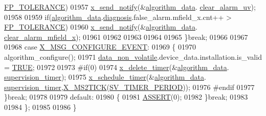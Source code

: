 \begin{DoxyCode}
      \hyperlink{a00017_a946f0acff4fd16a65859479e9e0b9513}{FP\_TOLERANCE})
01957               \hyperlink{a00036_ae17b0bb16da3c471bb6074bb4c4d0fee}{x\_send\_notify}(&\hyperlink{a00038_a183caa40cd01e79ee309cc9c4a225197}{algorithm\_data}.
      \hyperlink{a00016_a5d8e57dd19de326e75625a8704cfceee}{clear\_alarm\_uv});
01958 
01959               \textcolor{keywordflow}{if}(\hyperlink{a00038_a183caa40cd01e79ee309cc9c4a225197}{algorithm\_data}.\hyperlink{a00016_a16f85d57ec98b4ad05f5a2e10536b3c6}{diagnosis}.false\_alarm.mfield\_x.cnt++ > 
      \hyperlink{a00017_a946f0acff4fd16a65859479e9e0b9513}{FP\_TOLERANCE})
01960               \hyperlink{a00036_ae17b0bb16da3c471bb6074bb4c4d0fee}{x\_send\_notify}(&\hyperlink{a00038_a183caa40cd01e79ee309cc9c4a225197}{algorithm\_data}.
      \hyperlink{a00016_a57101a48bdde96a0db1ec63892095f7c}{clear\_alarm\_mfield\_x});
01961 
01962 
01963 
01964 
01965         \}\textcolor{keywordflow}{break};
01966 
01967 
01968         \textcolor{keywordflow}{case} \hyperlink{a00016_a410c7d83b819fa283303a53830c87a96}{X\_MSG\_CONFIGURE\_EVENT}:
01969         \{
01970             algorithm\_configure();
01971             \hyperlink{a00060_a76ac5f917f5308dcd83de0d7c94559fb}{data\_non\_volatile}.device\_data.installation.is\_valid = 
      \hyperlink{a00040_aa8cecfc5c5c054d2875c03e77b7be15d}{TRUE};
01972 
01973 \textcolor{preprocessor}{#if(0)}
01974           \hyperlink{a00036_ab69e9af4cfa717e870d587906283635c}{x\_delete\_timer}(&\hyperlink{a00038_a183caa40cd01e79ee309cc9c4a225197}{algorithm\_data}.
      \hyperlink{a00016_af13eb2dcaed3eca6506489f8ad8fa768}{supervision\_timer});
01975           \hyperlink{a00036_a9e3befaa21e83f196f74201deed85346}{x\_schedule\_timer}(&\hyperlink{a00038_a183caa40cd01e79ee309cc9c4a225197}{algorithm\_data}.
      \hyperlink{a00016_af13eb2dcaed3eca6506489f8ad8fa768}{supervision\_timer},\hyperlink{a00036_a1732cd929c486b3a225824bb2b3dba36}{X\_MS2TICK}(\hyperlink{a00023_a8a535456285f4602701c814d7b69cc68}{SV\_TIMER\_PERIOD}));
01976 \textcolor{preprocessor}{#endif}
01977         \}\textcolor{keywordflow}{break};
01978     
01979         \textcolor{keywordflow}{default}:
01980         \{
01981             \hyperlink{a00072_abb8ff8e213ac9f6fb21d2b968583b936}{ASSERT}(0);
01982         \}\textcolor{keywordflow}{break};
01983     
01984     \};
01985 
01986 \}
\end{DoxyCode}


